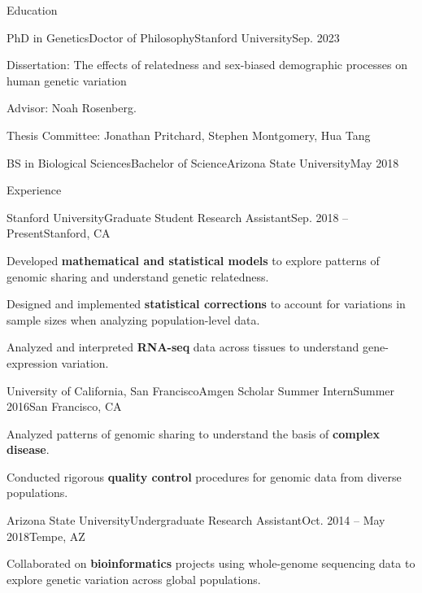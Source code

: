 \documentclass[]{kyvernitis-resume}
\newcommand\tcb[1]{\textcolor{navyblue}{\textbf{#1}}}
\begin{document}
\resumeheader
{}
{}
{}
{}
{}
{}

\begin{section}{Education}
    \begin{subsectionnobullet}{PhD in Genetics}{Doctor of Philosophy}{Stanford University}{Sep. 2023}
        \item{Dissertation: The effects of relatedness and sex-biased demographic processes on human genetic variation}
        \item{Advisor: Noah Rosenberg.}
        \item{Thesis Committee: Jonathan Pritchard, Stephen Montgomery, Hua Tang}
    \end{subsectionnobullet}
    
    \begin{subsectionnobullet}{BS in Biological Sciences}{Bachelor of Science}{Arizona State University}{May 2018}
        \item \vspace{-5mm}
    \end{subsectionnobullet}
\end{section}

\begin{section}{Experience}
    \begin{subsection}{Stanford University}{Graduate Student Research Assistant}{Sep. 2018 -- Present}{Stanford, CA}
        \item Developed \tcb{mathematical and statistical models} to explore patterns of genomic sharing and understand genetic relatedness. 
        \item Designed and implemented \tcb{statistical corrections} to account for variations in sample sizes when analyzing population-level data.
        \item Analyzed and interpreted \tcb{RNA-seq} data across tissues to understand gene-expression variation.
    \end{subsection}
    \vspace{-2mm}
     \begin{subsection}{University of California, San Francisco}{Amgen Scholar Summer Intern}{Summer 2016}{San Francisco, CA}
        \item Analyzed patterns of genomic sharing to understand the basis of \tcb{complex disease}.
        \item Conducted rigorous \tcb{quality control} procedures for genomic data from diverse populations.
    \end{subsection}
    \vspace{-2mm}
    \begin{subsection}{Arizona State University}{Undergraduate Research Assistant}{Oct. 2014 -- May 2018}{Tempe, AZ}
        \item Collaborated on \tcb{bioinformatics} projects using whole-genome sequencing data to explore genetic variation across global populations.
    \end{subsection}
\end{section}
\end{document}
